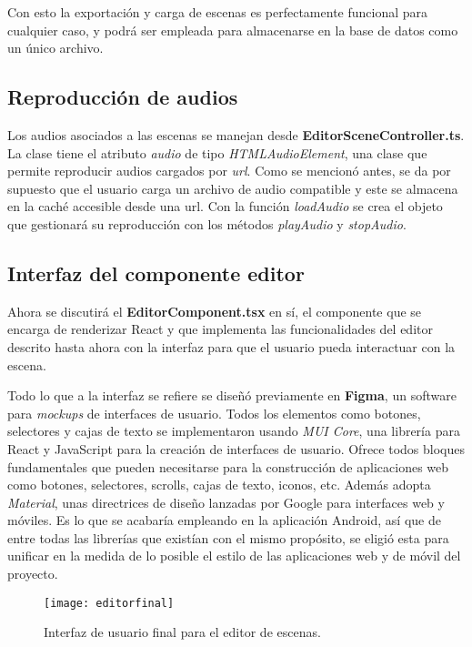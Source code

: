 Con esto la exportación y carga de escenas es perfectamente funcional para cualquier caso, y podrá ser empleada para almacenarse en la base de datos como un único archivo.

\subsection{Reproducción de audios}

Los audios asociados a las escenas se manejan desde \textbf{EditorSceneController.ts}. La clase tiene el atributo \textit{audio} de tipo \textit{HTMLAudioElement}, una clase que permite reproducir audios cargados por \textit{url}. Como se mencionó antes, se da por supuesto que el usuario carga un archivo de audio compatible y este se almacena en la caché accesible desde una url. Con la función \textit{loadAudio} se crea el objeto que gestionará su reproducción con los métodos \textit{playAudio} y \textit{stopAudio}.

\subsection{Interfaz del componente editor}

Ahora se discutirá el \textbf{EditorComponent.tsx} en sí, el componente que se encarga de renderizar React y que implementa las funcionalidades del editor descrito hasta ahora con la interfaz para que el usuario pueda interactuar con la escena.

Todo lo que a la interfaz se refiere se diseñó previamente en \textbf{Figma}\cite{figma}, un software para \textit{mockups} de interfaces de usuario. Todos los elementos como botones, selectores y cajas de texto se implementaron usando \textit{MUI Core}, una librería para React y JavaScript para la creación de interfaces de usuario. Ofrece todos bloques fundamentales que pueden necesitarse para la construcción de aplicaciones web como botones, selectores, scrolls, cajas de texto, iconos, etc. Además adopta \textit{Material}, unas directrices de diseño lanzadas por Google para interfaces web y móviles. Es lo que se acabaría empleando en la aplicación Android, así que de entre todas las librerías que existían con el mismo propósito, se eligió esta para unificar en la medida de lo posible el estilo de las aplicaciones web y de móvil del proyecto.

\begin{figure}[h]
    \centering
    \texttt{[image: editorfinal]}
    \caption[Interfaz de usuario para el editor de escenas]{Interfaz de usuario final para el editor de escenas.}
\end{figure}

